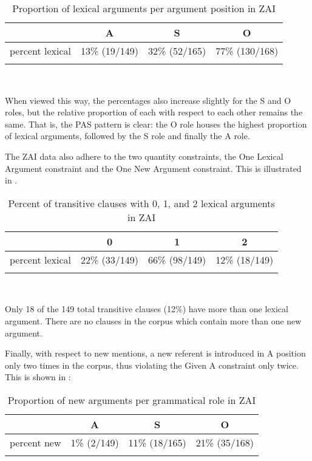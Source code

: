 \begin{table}

\caption{{Proportion of lexical arguments per argument position in ZAI}}
\begin{tabular}{| r  c  c  c }
\lsptoprule
 & A & S & O \\

\midrule
 percent lexical  &  13{\%} (19/149) &  32{\%} (52/165) &  77{\%} (130/168)  \\
  
\lspbottomrule
\end{tabular}\\
\label{proportionlexical}

\end{table}
When viewed this way, the percentages also increase slightly for the S and O roles, but the relative proportion of each with respect to each other remains the same. That is, the PAS pattern is clear: the O role houses the highest proportion of lexical arguments, followed by the S role and finally the A role.

The ZAI data also adhere to the two quantity constraints, the One Lexical Argument constraint and the One New Argument constraint. This is illustrated in .
\begin{table} [htp] 

\caption{{Percent of transitive clauses with 0, 1, and 2 lexical arguments in ZAI}}
\begin{tabular}{| r  c  c  c }
\lsptoprule
 & 0  & 1  & 2 \\

\midrule
percent lexical & 22{\%} (33/149) & 66{\%} (98/149) &  12{\%} (18/149)  \\
  
\lspbottomrule
\end{tabular}\\
\label{percenttrans}

\end{table}
Only 18 of the 149 total transitive clauses (12{\%}) have more than one lexical argument. There are no clauses in the corpus which contain more than one new argument. 

Finally, with respect to new mentions, a new referent is introduced in A position only two times in the corpus, thus violating the Given A constraint only twice. This is shown in :

\begin{table}

\caption{{Proportion of new arguments per grammatical role in ZAI}}
\begin{tabular}{| r  c  c  c }
\lsptoprule
 & A & S & O \\

\midrule
 percent new  &  1{\%} (2/149) &  11{\%} (18/165) & 21{\%} (35/168) \\
  
\lspbottomrule
\end{tabular}\\
\label{proportionnew}

\end{table}

